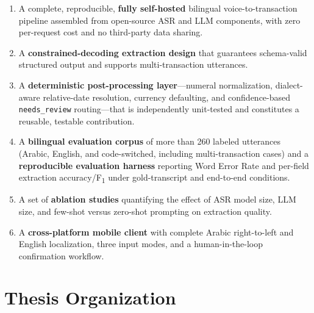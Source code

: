 \begin{enumerate}[label=\textbf{C\arabic*.}, leftmargin=*]
    \item A complete, reproducible, \textbf{fully self-hosted} bilingual
    voice-to-transaction pipeline assembled from open-source ASR and LLM
    components, with zero per-request cost and no third-party data sharing.
    \item A \textbf{constrained-decoding extraction design} that guarantees
    schema-valid structured output and supports multi-transaction utterances.
    \item A \textbf{deterministic post-processing layer}---numeral normalization,
    dialect-aware relative-date resolution, currency defaulting, and
    confidence-based \texttt{needs\_review} routing---that is independently
    unit-tested and constitutes a reusable, testable contribution.
    \item A \textbf{bilingual evaluation corpus} of more than 260 labeled
    utterances (Arabic, English, and code-switched, including multi-transaction
    cases) and a \textbf{reproducible evaluation harness} reporting Word Error
    Rate and per-field extraction accuracy/F\textsubscript{1} under
    gold-transcript and end-to-end conditions.
    \item A set of \textbf{ablation studies} quantifying the effect of ASR model
    size, LLM size, and few-shot versus zero-shot prompting on extraction
    quality.
    \item A \textbf{cross-platform mobile client} with complete Arabic
    right-to-left and English localization, three input modes, and a
    human-in-the-loop confirmation workflow.
\end{enumerate}

\section{Thesis Organization}

